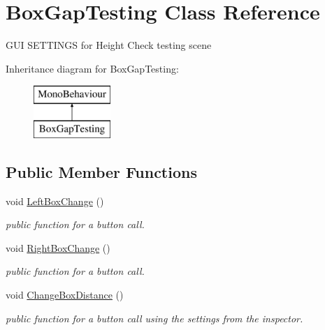 \hypertarget{class_box_gap_testing}{}\section{Box\+Gap\+Testing Class Reference}
\label{class_box_gap_testing}


G\+UI S\+E\+T\+T\+I\+N\+GS for Height Check testing scene  


Inheritance diagram for Box\+Gap\+Testing\+:\begin{figure}[H]
\begin{center}
\leavevmode
\includegraphics[height=2.000000cm]{class_box_gap_testing}
\end{center}
\end{figure}
\subsection*{Public Member Functions}
\begin{DoxyCompactItemize}
\item 
void \mbox{\hyperlink{class_box_gap_testing_a03667bc0c91f50945b1c4e35c5a54011}{Left\+Box\+Change}} ()
\begin{DoxyCompactList}\small\item\em public function for a button call. \end{DoxyCompactList}\item 
void \mbox{\hyperlink{class_box_gap_testing_adeb99d0b392bf06123f31aeded6ee4a8}{Right\+Box\+Change}} ()
\begin{DoxyCompactList}\small\item\em public function for a button call. \end{DoxyCompactList}\item 
void \mbox{\hyperlink{class_box_gap_testing_a68cba39d1388e2c57edd7bf3595574cd}{Change\+Box\+Distance}} ()
\begin{DoxyCompactList}\small\item\em public function for a button call using the settings from the inspector. \end{DoxyCompactList}\end{DoxyCompactItemize}
